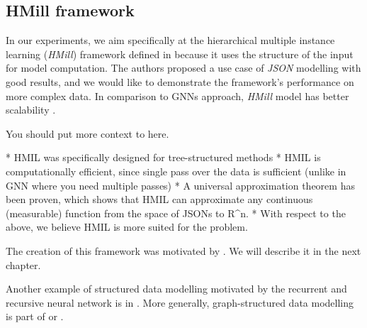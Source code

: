 \subsection{HMill framework}
In our experiments, we aim specifically at the hierarchical multiple instance learning (\emph{HMill}) framework defined in \cite{Mandlik2020} because it uses the structure of the input for model computation. The authors proposed a use case of \emph{JSON} modelling with good results, and we would like to demonstrate the framework's performance on more complex data. In comparison to GNNs approach, \emph{HMill} model has better scalability \cite{Mandlik2020}. 

You should put more context to here.

* HMIL was specifically designed for tree-structured methods
* HMIL is computationally efficient, since single pass over the data is sufficient (unlike in GNN where you need multiple passes)
* A universal approximation theorem has been proven, which shows that HMIL can approximate any continuous (measurable) function from the space of JSONs to R^n.
* With respect to the above, we believe HMIL is more suited for the problem.

The creation of this framework was motivated by \cite{Pevny2016a}. We will describe it in the next chapter.

Another example of structured data modelling motivated by the recurrent and recursive neural network is in \cite{Woof2020}. More generally, graph-structured data modelling is part of \cite{Henaff2015} or \cite{Borgwardt2005}.



